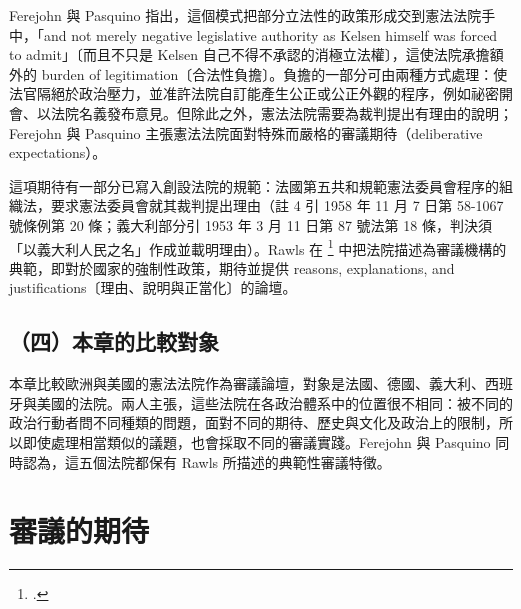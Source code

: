 Ferejohn 與 Pasquino 指出，這個模式把部分立法性的政策形成交到憲法法院手中，「and not merely negative legislative authority as Kelsen himself was forced to admit」〔而且不只是 Kelsen 自己不得不承認的消極立法權〕，這使法院承擔額外的 burden of legitimation〔合法性負擔〕。負擔的一部分可由兩種方式處理：使法官隔絕於政治壓力，並准許法院自訂能產生公正或公正外觀的程序，例如祕密開會、以法院名義發布意見。但除此之外，憲法法院需要為裁判提出有理由的說明；Ferejohn 與 Pasquino 主張憲法法院面對特殊而嚴格的審議期待（deliberative expectations）。

這項期待有一部分已寫入創設法院的規範：法國第五共和規範憲法委員會程序的組織法，要求憲法委員會就其裁判提出理由（註 4 引 1958 年 11 月 7 日第 58-1067 號條例第 20 條；義大利部分引 1953 年 3 月 11 日第 87 號法第 18 條，判決須「以義大利人民之名」作成並載明理由）。Rawls 在 \footcite[231--236]{rawls1993} 中把法院描述為審議機構的典範，即對於國家的強制性政策，期待並提供 reasons, explanations, and justifications〔理由、說明與正當化〕的論壇。

\subsection{（四）本章的比較對象}

本章比較歐洲與美國的憲法法院作為審議論壇，對象是法國、德國、義大利、西班牙與美國的法院。兩人主張，這些法院在各政治體系中的位置很不相同：被不同的政治行動者問不同種類的問題，面對不同的期待、歷史與文化及政治上的限制，所以即使處理相當類似的議題，也會採取不同的審議實踐。Ferejohn 與 Pasquino 同時認為，這五個法院都保有 Rawls 所描述的典範性審議特徵。

\section{審議的期待}
\label{sec:FP-2}

